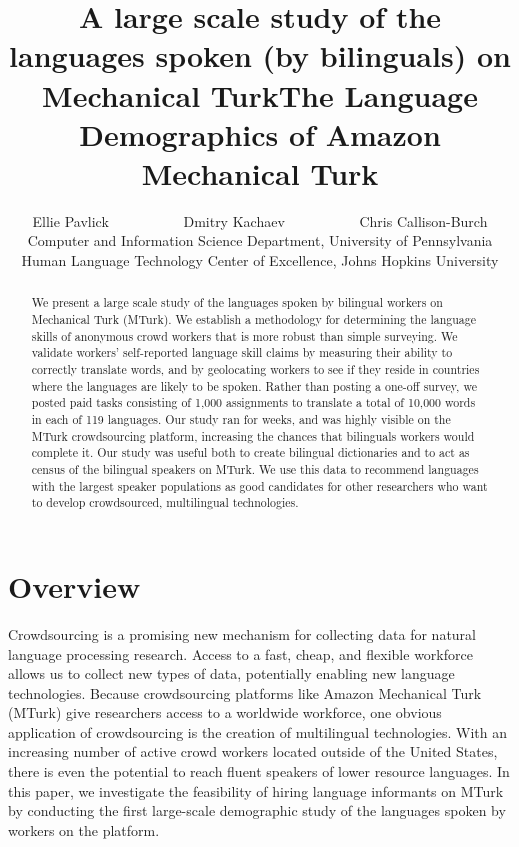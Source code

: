 \documentclass[11pt]{article}
\title{A large scale study of the languages spoken (by bilinguals) on Mechanical Turk}
\title{The Language Demographics of  Amazon Mechanical Turk}
\author{Ellie Pavlick \ \ \ \ \ \ \ \ \ \ Dmitry Kachaev \ \ \ \ \ \ \ \ \ \  Chris Callison-Burch \\
Computer and Information Science Department, University of Pennsylvania \\
Human Language Technology Center of Excellence, Johns Hopkins University \\
  }
\date{}
\begin{document}
\maketitle

\begin{abstract}
We present a large scale study of the languages spoken by bilingual workers on Mechanical Turk (MTurk).  
We establish a  methodology for determining the language skills of anonymous crowd workers that is more robust than simple surveying.  We validate workers' self-reported language skill claims by measuring their ability to correctly translate words, and by geolocating workers to see if they reside in countries where the languages are likely to be spoken. Rather than posting a one-off survey, we posted paid tasks consisting of 1,000 assignments to translate a total of 10,000 words in each of 119 languages.  Our study ran for weeks, and was highly visible on the MTurk crowdsourcing platform, increasing the chances that bilinguals workers would complete it.  Our study was useful both to create bilingual dictionaries and to act as census of the bilingual speakers on MTurk.  We use this data to recommend languages with the largest speaker populations as good candidates for other researchers who want to  develop crowdsourced, multilingual technologies.

\end{abstract}

\section{Overview}
Crowdsourcing is a promising new mechanism for collecting data for natural language processing research. Access to a fast, cheap, and flexible workforce allows us to collect new types of data, potentially enabling new language technologies.
Because crowdsourcing platforms like Amazon Mechanical Turk (MTurk) give researchers access to a worldwide workforce, one obvious application of crowdsourcing is the creation of multilingual technologies. 
With an increasing number of active crowd workers located outside of the United States, there is even the potential to reach fluent speakers of lower resource languages.
In this paper, we investigate the feasibility of hiring language informants on MTurk by conducting the first large-scale demographic study of the languages spoken by workers on the platform. 
\end{document}
